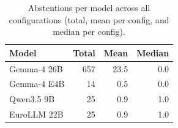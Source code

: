 \begin{table}[t]
\centering
\caption{Abstentions per model across all configurations (total, mean per config, and median per config).}
\label{tab:abstentions}
\small
\begin{tabular}{lrrr}
\toprule
Model & Total & Mean & Median \\
\midrule
Gemma-4 26B & 657 & 23.5 & 0.0 \\
Gemma-4 E4B & 14 & 0.5 & 0.0 \\
Qwen3.5 9B & 25 & 0.9 & 1.0 \\
EuroLLM 22B & 25 & 0.9 & 1.0 \\
\bottomrule
\end{tabular}
\end{table}